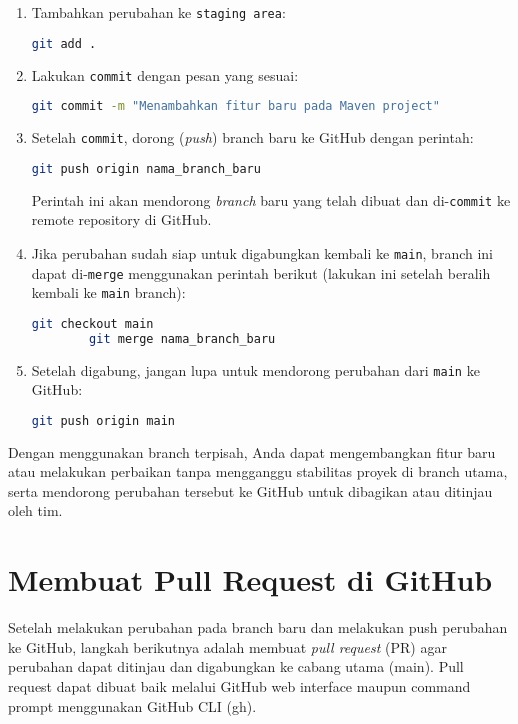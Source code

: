 \begin{enumerate}
	\item Tambahkan perubahan ke \texttt{staging area}:
	\begin{lstlisting}[language=bash]
		git add .
	\end{lstlisting}
	
	\item Lakukan \texttt{commit} dengan pesan yang sesuai:
	\begin{lstlisting}[language=bash]
		git commit -m "Menambahkan fitur baru pada Maven project"
	\end{lstlisting}
	
	\item Setelah \texttt{commit}, dorong (\textit{push}) branch baru ke GitHub dengan perintah:
	\begin{lstlisting}[language=bash]
		git push origin nama_branch_baru
	\end{lstlisting}
	Perintah ini akan mendorong \textit{branch} baru yang telah dibuat dan di-\texttt{commit} ke remote repository di GitHub.
	
	\item Jika perubahan sudah siap untuk digabungkan kembali ke \texttt{main}, branch ini dapat di-\texttt{merge} menggunakan perintah berikut (lakukan ini setelah beralih kembali ke \texttt{main} branch):
	\begin{lstlisting}[language=bash]
		git checkout main
		git merge nama_branch_baru
	\end{lstlisting}
	
	\item Setelah digabung, jangan lupa untuk mendorong perubahan dari \texttt{main} ke GitHub:
	\begin{lstlisting}[language=bash]
		git push origin main
	\end{lstlisting}
\end{enumerate}

Dengan menggunakan branch terpisah, Anda dapat mengembangkan fitur baru atau melakukan perbaikan tanpa mengganggu stabilitas proyek di branch utama, serta mendorong perubahan tersebut ke GitHub untuk dibagikan atau ditinjau oleh tim.



\section{Membuat Pull Request di GitHub}

Setelah melakukan perubahan pada branch baru dan melakukan push perubahan ke GitHub, langkah berikutnya adalah membuat \textit{pull request} (PR) agar perubahan dapat ditinjau dan digabungkan ke cabang utama (main). Pull request dapat dibuat baik melalui GitHub web interface maupun command prompt menggunakan GitHub CLI (gh).

